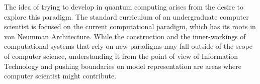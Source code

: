The idea of trying to develop in quantum computing arises from the desire to explore this paradigm. The standard curriculum of an undergraduate computer scientist is focused on the current computational paradigm, which has its roots in von Neumman Architecture\cite{neumann45edvac}. While the construction and the inner-workings of computational systems that rely on new paradigms may fall outside of the scope of computer science, understanding it from the point of view of Information Technology and pushing boundaries on model representation are areas where computer scientist might contribute.


